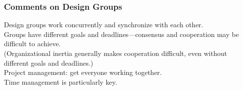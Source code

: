 \begin{frame}

\frametitle{Comments on Design Groups}
\begin{changemargin}{1cm}
Design groups work concurrently and synchronize with each other.\\[1em]

Groups have different goals and deadlines---consensus and
cooperation may be difficult to achieve. \\[1em]

(Organizational inertia generally makes cooperation difficult, even
without different goals and deadlines.)\\[1em]

Project management: get everyone working together.\\[1em]

Time management is particularly key.
\end{changemargin}
\end{frame}



